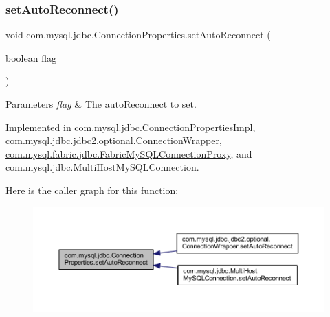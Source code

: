 \subsubsection{\texorpdfstring{set\+Auto\+Reconnect()}{setAutoReconnect()}}
{\footnotesize\ttfamily void com.\+mysql.\+jdbc.\+Connection\+Properties.\+set\+Auto\+Reconnect (\begin{DoxyParamCaption}\item[{boolean}]{flag }\end{DoxyParamCaption})}


\begin{DoxyParams}{Parameters}
{\em flag} & The auto\+Reconnect to set. \\
\hline
\end{DoxyParams}


Implemented in \mbox{\hyperlink{classcom_1_1mysql_1_1jdbc_1_1_connection_properties_impl_ad6ee40ab61735068bba0e16798ac8606}{com.\+mysql.\+jdbc.\+Connection\+Properties\+Impl}}, \mbox{\hyperlink{classcom_1_1mysql_1_1jdbc_1_1jdbc2_1_1optional_1_1_connection_wrapper_ab60e87c0bf38561dcfae0c6a3524ef27}{com.\+mysql.\+jdbc.\+jdbc2.\+optional.\+Connection\+Wrapper}}, \mbox{\hyperlink{classcom_1_1mysql_1_1fabric_1_1jdbc_1_1_fabric_my_s_q_l_connection_proxy_a4cf0201f778393edb377500648f28260}{com.\+mysql.\+fabric.\+jdbc.\+Fabric\+My\+S\+Q\+L\+Connection\+Proxy}}, and \mbox{\hyperlink{classcom_1_1mysql_1_1jdbc_1_1_multi_host_my_s_q_l_connection_a5444b292e218f16cfc2baadf784c35ab}{com.\+mysql.\+jdbc.\+Multi\+Host\+My\+S\+Q\+L\+Connection}}.

Here is the caller graph for this function\+:\nopagebreak
\begin{figure}[H]
\begin{center}
\leavevmode
\includegraphics[width=350pt]{interfacecom_1_1mysql_1_1jdbc_1_1_connection_properties_aee554c71f65458593f28c1e7d79846d1_icgraph}
\end{center}
\end{figure}
\mbox{\label{interfacecom_1_1mysql_1_1jdbc_1_1_connection_properties_afd29baec0fcca703af94fac13342e6bf}} 
